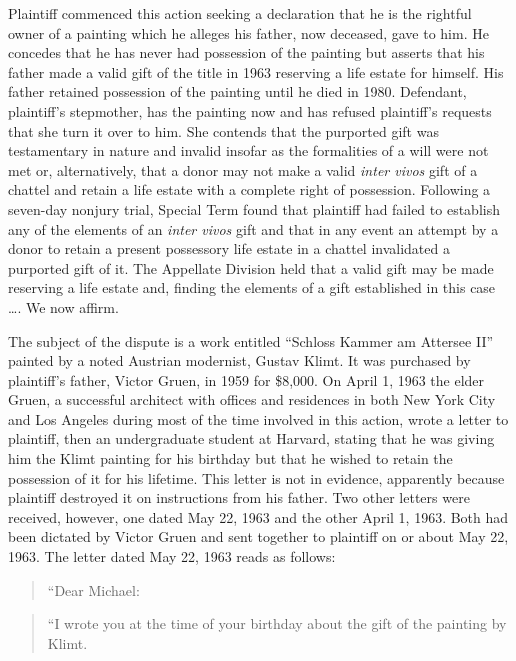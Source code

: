 

Plaintiff commenced this action seeking a declaration that he is the rightful
owner of a painting which he alleges his father, now deceased, gave to him. He
concedes that he has never had possession of the painting but asserts that his
father made a valid gift of the title in 1963 reserving a life estate for
himself. His father retained possession of the painting until he died in 1980.
Defendant, plaintiff's stepmother, has the painting now and has refused
plaintiff's requests that she turn it over to him. She contends that the
purported gift was testamentary in nature and invalid insofar as the
formalities of a will were not met or, alternatively, that a donor may not make
a valid \textit{inter vivos} gift of a chattel and retain a life estate with a
complete right of possession. Following a seven-day nonjury trial, Special Term
found that plaintiff had failed to establish any of the elements of an
\textit{inter vivos} gift and that in any event an attempt by a donor to retain
a present possessory life estate in a chattel invalidated a purported gift of
it. The Appellate Division held that a valid gift may be made reserving a life
estate and, finding the elements of a gift established in this case \dots{}. We
now affirm.

The subject of the dispute is a work entitled ``Schloss Kammer am Attersee II''
painted by a noted Austrian modernist, Gustav Klimt. It was purchased by
plaintiff's father, Victor Gruen, in 1959 for \$8,000. On April 1, 1963 the
elder Gruen, a successful architect with offices and residences in both New
York City and Los Angeles during most of the time involved in this action,
wrote a letter to plaintiff, then an undergraduate student at Harvard, stating
that he was giving him the Klimt painting for his birthday but that he wished
to retain the possession of it for his lifetime. This letter is not in
evidence, apparently because plaintiff destroyed it on instructions from his
father. Two other letters were received, however, one dated May 22, 1963 and
the other April 1, 1963. Both had been dictated by Victor Gruen and sent
together to plaintiff on or about May 22, 1963. The letter dated May 22, 1963
reads as follows:

\begin{quote}
{}``Dear Michael:
\end{quote}

\begin{quote}
{}``I wrote you at the time of your birthday about the gift of the painting by
Klimt.
\end{quote}

